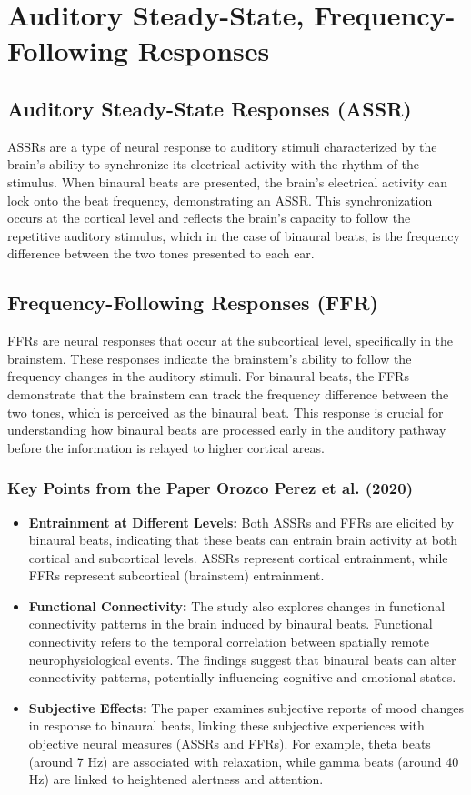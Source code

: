 \documentclass{article}
\begin{document}
\section{Auditory Steady-State, Frequency-Following Responses}
    
\subsection{Auditory Steady-State Responses (ASSR)}
ASSRs are a type of neural response to auditory stimuli characterized by the brain's ability to synchronize its electrical activity with the rhythm of the stimulus. When binaural beats are presented, the brain's electrical activity can lock onto the beat frequency, demonstrating an ASSR. This synchronization occurs at the cortical level and reflects the brain's capacity to follow the repetitive auditory stimulus, which in the case of binaural beats, is the frequency difference between the two tones presented to each ear.

\subsection{Frequency-Following Responses (FFR)}
FFRs are neural responses that occur at the subcortical level, specifically in the brainstem. These responses indicate the brainstem's ability to follow the frequency changes in the auditory stimuli. For binaural beats, the FFRs demonstrate that the brainstem can track the frequency difference between the two tones, which is perceived as the binaural beat. This response is crucial for understanding how binaural beats are processed early in the auditory pathway before the information is relayed to higher cortical areas.

\subsubsection{Key Points from the Paper Orozco Perez et al. (2020)}
\begin{itemize}
    \item \textbf{Entrainment at Different Levels:} Both ASSRs and FFRs are elicited by binaural beats, indicating that these beats can entrain brain activity at both cortical and subcortical levels. ASSRs represent cortical entrainment, while FFRs represent subcortical (brainstem) entrainment.
    \item \textbf{Functional Connectivity:} The study also explores changes in functional connectivity patterns in the brain induced by binaural beats. Functional connectivity refers to the temporal correlation between spatially remote neurophysiological events. The findings suggest that binaural beats can alter connectivity patterns, potentially influencing cognitive and emotional states.
    \item \textbf{Subjective Effects:} The paper examines subjective reports of mood changes in response to binaural beats, linking these subjective experiences with objective neural measures (ASSRs and FFRs). For example, theta beats (around 7 Hz) are associated with relaxation, while gamma beats (around 40 Hz) are linked to heightened alertness and attention.
\end{itemize}
\end{document}
